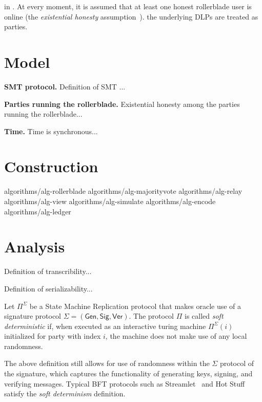in . At every moment, it is
assumed that at least one honest rollerblade user is online (the
\emph{existential honesty} assumption~\cite{backbone}).
the underlying DLPs are treated as parties.

\section{Model}

\noindent
\textbf{SMT protocol.}
Definition of SMT ...

\noindent
\textbf{Parties running the rollerblade.}
Existential honesty among the parties running the rollerblade...

\noindent
\textbf{Time.}
Time is synchronous...

\section{Construction}

{algorithms/alg-rollerblade}
{algorithms/alg-majorityvote}
{algorithms/alg-relay}
{algorithms/alg-view}
{algorithms/alg-simulate}
{algorithms/alg-encode}
{algorithms/alg-ledger}

\section{Analysis}

\begin{definition}[Transcribability]
      Definition of transcribility...
\end{definition}

\begin{definition}[Serializability]
      Definition of serializability...
\end{definition}

\begin{definition}
      Let $\Pi^\Sigma$ be a State Machine Replication protocol that makes
      oracle use of a signature protocol $\Sigma = (\textsf{Gen}, \textsf{Sig}, \textsf{Ver})$.
      The protocol $\Pi$ is called \emph{soft deterministic} if,
      when executed as an interactive turing machine $\Pi^\Sigma(i)$ initialized for party
      with index $i$, the machine does not make use of any local randomness.
\end{definition}

The above definition still allows for use of randomness within the $\Sigma$ protocol of the
signature, which captures the functionality of generating keys, signing, and verifying
messages. Typical BFT protocols such as Streamlet~\cite{streamlet} and Hot Stuff~\cite{hot-stuff}
satisfy the \emph{soft determinism} definition.

